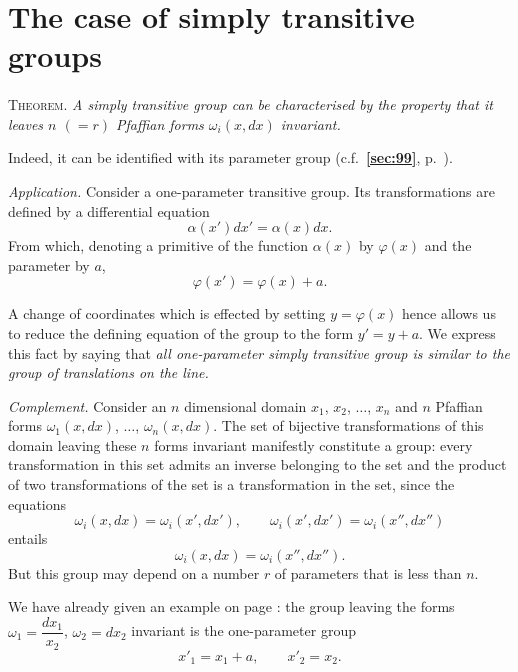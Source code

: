 \documentclass[leqno,11pt]{book}
\makeatletter
\numberwithin{equation}{chapter}
\theoremstyle{shape1}
\theoremstyle{shapesmall}
\let\old@phi\phi
\let\old@varphi\varphi
\let\phi\old@varphi
\let\varphi\old@phi
\newcommand{\fsref}[1]{{\rm\textsection\textbf{\ref{sec:#1}}}}
\newcommand{\somespace}{\vspace{9pt}}
\makeatother
\begin{document}
\section{The case of simply transitive groups}
\label{sec:case-simply-trans}

\paragraph{}
\label{sec:106}
\textsc{Theorem.} \emph{A simply transitive group can be characterised by the property that it leaves $n$ $(=r)$ Pfaffian forms $\omega_{i}(x,dx)$ invariant.}

\somespace

Indeed, it can be identified with its parameter group (c.f.~\fsref{99}, p.~\pageref{sec:99}).

\somespace

\emph{Application.} Consider a one-parameter transitive group. Its transformations are defined by a differential equation
\[
\alpha(x')dx'=\alpha(x)dx.
\]
From which, denoting a primitive of the function $\alpha(x)$ by $\phi(x)$ and the parameter by $a$,
\[
\phi(x')=\phi(x)+a.
\]

A change of coordinates which is effected by setting $y=\phi(x)$ hence allows us to reduce the defining equation of the group to the form $y'=y+a$. We express this fact by saying that \emph{all one-parameter simply transitive group is similar to the group of translations on the line.}

\somespace

{\small
\emph{Complement.} Consider an $n$ dimensional domain $x_{1}$, $x_{2}$, $\dots$, $x_{n}$ and $n$ Pfaffian forms $\omega_{1}(x,dx)$, $\dots$, $\omega_{n}(x,dx)$. The set of bijective transformations of this domain leaving these $n$ forms invariant manifestly constitute a group: every transformation in this set admits an inverse belonging to the set and the product of two transformations of the set is a transformation in the set, since the equations
\[
\omega_{i}(x,dx)=\omega_{i}(x',dx'),\qquad \omega_{i}(x',dx')=\omega_{i}(x'',dx'')
\]
entails
\[
\omega_{i}(x,dx)=\omega_{i}(x'',dx'').
\]
But this group may depend on a number $r$ of parameters that is less than $n$.

We have already given an example on page \pageref{sec:83}: the group leaving the forms $\omega_{1}=\dfrac{dx_{1}}{x_{2}}$, $\omega_{2}=dx_{2}$ invariant is the one-parameter group
\[
x'_{1}=x_{1}+a,\qquad x'_{2}=x_{2}.
\]}
\end{document}
